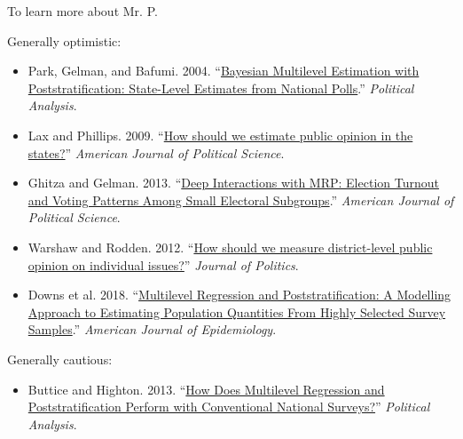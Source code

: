 \documentclass[aspectratio=169]{beamer}
\begin{document}
\begin{frame}{To learn more about Mr. P.}

{\footnotesize
Generally optimistic:
\begin{itemize}
\item Park, Gelman, and Bafumi. 2004. ``\textcolor{blue}{\href{https://www.jstor.org/stable/25791784}{Bayesian Multilevel Estimation with Poststratification: State-Level Estimates from National Polls}}.'' \textit{Political Analysis}.
\item Lax and Phillips. 2009. ``\textcolor{blue}{\href{https://www.jstor.org/stable/25193870}{How should we estimate public opinion in the states?}}'' \textit{American Journal of Political Science}.
\item Ghitza and Gelman. 2013. ``\textcolor{blue}{\href{https://www.jstor.org/stable/23496652}{Deep Interactions with MRP: Election Turnout and Voting Patterns Among Small Electoral Subgroups}}.'' \textit{American Journal of Political Science}.
\item Warshaw and Rodden. 2012. ``\textcolor{blue}{\href{http://www.jstor.org/stable/10.1017/s0022381611001204}{How should we measure district-level public opinion on individual issues?}}'' \textit{Journal of Politics}.
\item Downs et al. 2018. ``\textcolor{blue}{\href{https://doi.org/10.1093/aje/kwy070}{Multilevel Regression and Poststratification: A Modelling Approach to Estimating Population Quantities From Highly Selected Survey Samples}}.'' \textit{American Journal of Epidemiology}.
\end{itemize}
Generally cautious:
\begin{itemize}
\item Buttice and Highton. 2013. ``\textcolor{blue}{\href{http://www.jstor.org/stable/24572674}{How Does Multilevel Regression and Poststratification Perform with Conventional National Surveys?}}'' \textit{Political Analysis}.
\end{itemize}
}

\end{frame}
%
%
\end{document}
